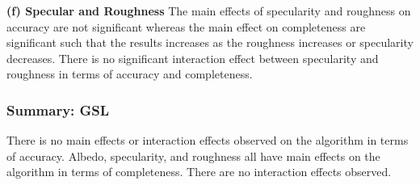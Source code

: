 \textbf{(f) Specular and Roughness} 
The main effects of specularity and roughness on accuracy are not significant whereas the main effect on completeness are significant such that the results increases as the roughness increases or specularity decreases. There is no significant interaction effect between specularity and roughness in terms of accuracy and completeness.

\subsubsection{Summary: GSL}
There is no main effects or interaction effects observed on the algorithm in terms of accuracy. Albedo, specularity, and roughness all have main effects on the algorithm in terms of completeness. There are no interaction effects observed.

